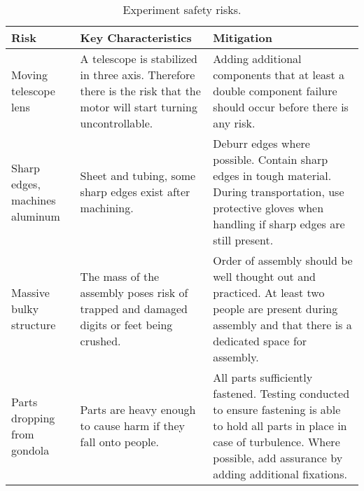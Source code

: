 \begin{table}[H]
    \centering
    \begin{tabular}{|m{}|m{}|m{}|}
    	\hline
    	\textbf{Risk} & \textbf{Key Characteristics} & \textbf{Mitigation} \\\hline
    	
    	Moving telescope lens & 
    	A telescope is stabilized in three axis. Therefore there is the risk that the motor will start turning uncontrollable. &
    	Adding additional components that at least a double component failure should occur before there is any risk. \\\hline
    	
    	Sharp edges, machines aluminum &
    	Sheet and tubing, some sharp edges exist after machining. &
    	Deburr edges where possible. Contain sharp edges in tough material. During transportation, use protective gloves when handling if sharp edges are still present. \\\hline
    	
    	Massive bulky structure &
    	The mass of the assembly poses risk of trapped and damaged digits or feet being crushed. &
    	Order of assembly should be well thought out and practiced. At least two people are present during assembly and that there is a dedicated space for assembly. \\\hline
    	
    	Parts dropping from gondola &
    	Parts are heavy enough to cause harm if they fall onto people. &
    	All parts sufficiently fastened. Testing conducted to ensure fastening is able to hold all parts in place in case of turbulence. Where possible, add assurance by adding additional fixations. \\\hline
    
    \end{tabular}
    \caption{Experiment safety risks.}
    \label{tab:safrisk}
\end{table}